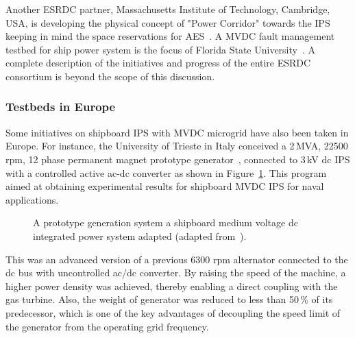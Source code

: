 \documentclass[10pt]{IETBook}
\begin{document}
Another ESRDC partner, Massachusetts Institute of Technology, Cambridge, USA, is developing the physical concept of "Power Corridor" towards the IPS keeping in mind the space reservations for AES~\cite{mit}. A MVDC fault management testbed for ship power system is the focus of Florida State University~\cite{fsu}. A complete description of the initiatives and progress of the entire ESRDC consortium is beyond the scope of this discussion.
\subsubsection{Testbeds in Europe}
Some initiatives on shipboard IPS with MVDC microgrid have also been taken in Europe. For instance, the University of Trieste in Italy conceived a 2\,MVA, 22500 rpm, 12 phase permanent magnet  prototype generator~\cite{sulli}, connected to 3\,kV dc IPS with a controlled active ac-dc converter as shown in Figure~\ref{figsulli}. This program aimed at obtaining experimental results for shipboard MVDC IPS for naval applications. 
\begin{figure}[!h]
\centerline{}
\caption{A prototype generation system a shipboard medium voltage dc integrated power system adapted (adapted from~\cite{sulli}).}
\label{figsulli}
\end{figure}

This was an advanced version of a previous 6300 rpm alternator connected to the dc bus with uncontrolled ac/dc converter. By raising the speed of the machine, a higher power density was achieved, thereby enabling a direct coupling with the gas turbine. Also, the weight of generator was reduced to less than 50\,\% of its predecessor, which is one of the key advantages of decoupling the speed limit of the generator from the operating grid frequency. 
\end{document}

